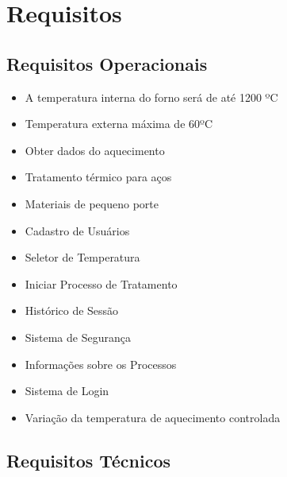 \section{Requisitos}

\subsection{Requisitos Operacionais}

\begin{itemize}
	\item A temperatura interna do forno será de até 1200 ºC
	\item Temperatura externa máxima de 60ºC
	\item Obter dados do aquecimento
	\item Tratamento térmico para aços
	\item Materiais de pequeno porte
	\item Cadastro de Usuários
	\item Seletor de Temperatura
	\item Iniciar Processo de Tratamento
	\item Histórico de Sessão
	\item Sistema de Segurança
	\item Informações sobre os Processos
	\item Sistema de Login
	\item Variação da temperatura de aquecimento controlada
\end{itemize}

\subsection{Requisitos Técnicos}

